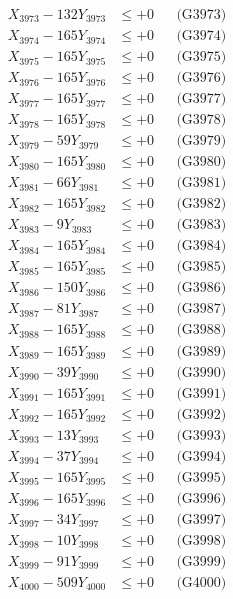 \documentclass[a4paper,10pt]{article}
\begin{document}
{\begin{align}
X_{3973} - 132Y_{3973} &\leq +0 && \text{(G3973)} \\
X_{3974} - 165Y_{3974} &\leq +0 && \text{(G3974)} \\
X_{3975} - 165Y_{3975} &\leq +0 && \text{(G3975)} \\
X_{3976} - 165Y_{3976} &\leq +0 && \text{(G3976)} \\
X_{3977} - 165Y_{3977} &\leq +0 && \text{(G3977)} \\
X_{3978} - 165Y_{3978} &\leq +0 && \text{(G3978)} \\
X_{3979} - 59Y_{3979} &\leq +0 && \text{(G3979)} \\
X_{3980} - 165Y_{3980} &\leq +0 && \text{(G3980)} \\
\allowbreak
X_{3981} - 66Y_{3981} &\leq +0 && \text{(G3981)} \\
X_{3982} - 165Y_{3982} &\leq +0 && \text{(G3982)} \\
X_{3983} - 9Y_{3983} &\leq +0 && \text{(G3983)} \\
X_{3984} - 165Y_{3984} &\leq +0 && \text{(G3984)} \\
X_{3985} - 165Y_{3985} &\leq +0 && \text{(G3985)} \\
X_{3986} - 150Y_{3986} &\leq +0 && \text{(G3986)} \\
X_{3987} - 81Y_{3987} &\leq +0 && \text{(G3987)} \\
X_{3988} - 165Y_{3988} &\leq +0 && \text{(G3988)} \\
X_{3989} - 165Y_{3989} &\leq +0 && \text{(G3989)} \\
X_{3990} - 39Y_{3990} &\leq +0 && \text{(G3990)} \\
\allowbreak
X_{3991} - 165Y_{3991} &\leq +0 && \text{(G3991)} \\
X_{3992} - 165Y_{3992} &\leq +0 && \text{(G3992)} \\
X_{3993} - 13Y_{3993} &\leq +0 && \text{(G3993)} \\
X_{3994} - 37Y_{3994} &\leq +0 && \text{(G3994)} \\
X_{3995} - 165Y_{3995} &\leq +0 && \text{(G3995)} \\
X_{3996} - 165Y_{3996} &\leq +0 && \text{(G3996)} \\
X_{3997} - 34Y_{3997} &\leq +0 && \text{(G3997)} \\
X_{3998} - 10Y_{3998} &\leq +0 && \text{(G3998)} \\
X_{3999} - 91Y_{3999} &\leq +0 && \text{(G3999)} \\
X_{4000} - 509Y_{4000} &\leq +0 && \text{(G4000)} \\

\end{align}}
\end{document}
